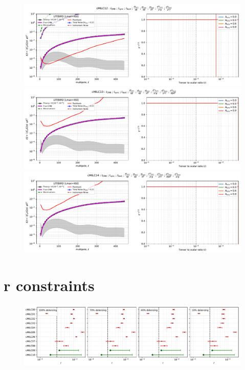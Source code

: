\documentclass[11pt]{article}
\begin{document}
\begin{figure}
\centering
\includegraphics[width=1.2\textwidth]{ps_and_bbposterir_cMILC12.pdf}
\includegraphics[width=1.2\textwidth]{ps_and_bbposterir_cMILC13.pdf}
\includegraphics[width=1.2\textwidth]{ps_and_bbposterir_cMILC14.pdf}
\end{figure}

\newpage
\section{r constraints}
\begin{figure}
\centering
\includegraphics[width=1.2\textwidth]{LITEBIRD_summary_statistics.pdf}
\end{figure}
\end{document}

